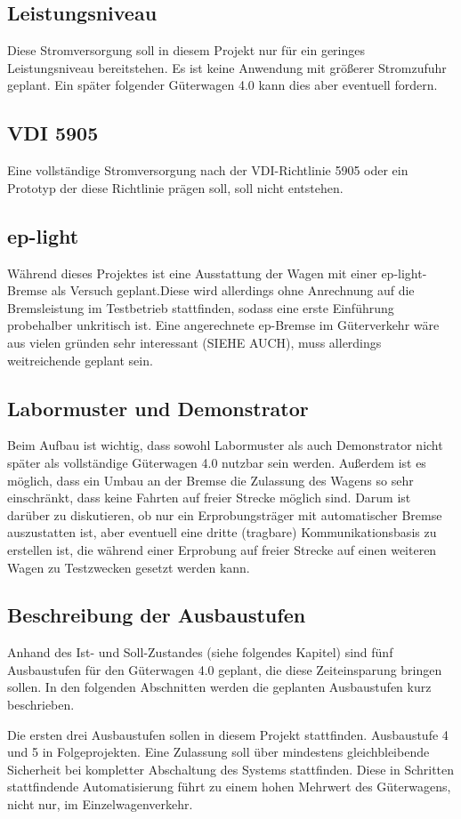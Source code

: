 \subsection{Leistungsniveau}
Diese Stromversorgung soll in diesem Projekt nur für ein geringes Leistungsniveau bereitstehen. Es ist keine Anwendung mit größerer Stromzufuhr geplant. Ein später folgender Güterwagen 4.0  kann dies aber eventuell fordern.
\subsection{VDI 5905}
Eine vollständige Stromversorgung nach der VDI-Richtlinie 5905 oder ein Prototyp der diese Richtlinie prägen soll, soll nicht entstehen. 
\subsection{ep-light}
Während dieses Projektes ist eine Ausstattung der Wagen mit einer ep-light-Bremse als Versuch geplant.Diese wird allerdings ohne Anrechnung auf die Bremsleistung im Testbetrieb stattfinden, sodass eine erste Einführung probehalber unkritisch ist. Eine angerechnete ep-Bremse im Güterverkehr wäre aus vielen gründen sehr interessant (SIEHE AUCH), muss allerdings weitreichende geplant sein.\par
\subsection{Labormuster und Demonstrator}
Beim Aufbau ist wichtig, dass sowohl Labormuster als auch Demonstrator nicht später als vollständige Güterwagen 4.0 nutzbar sein werden. Außerdem ist es möglich, dass ein Umbau an der Bremse die Zulassung des Wagens so sehr einschränkt, dass keine Fahrten auf freier Strecke möglich sind. Darum ist darüber zu diskutieren, ob nur ein Erprobungsträger mit automatischer Bremse auszustatten ist, aber eventuell eine dritte (tragbare) Kommunikationsbasis zu erstellen ist, die während einer Erprobung auf freier Strecke auf einen weiteren Wagen zu Testzwecken gesetzt werden kann.
\subsection{Beschreibung der Ausbaustufen}\label{sec:Ausbaustufen}
Anhand des Ist- und Soll-Zustandes (siehe folgendes Kapitel) sind fünf Ausbaustufen für den Güterwagen 4.0 geplant, die diese Zeiteinsparung bringen sollen. In den folgenden Abschnitten werden die geplanten Ausbaustufen kurz beschrieben.\par
Die ersten drei Ausbaustufen sollen in diesem Projekt stattfinden. Ausbaustufe 4 und 5 in Folgeprojekten. Eine Zulassung soll über mindestens gleichbleibende Sicherheit bei kompletter Abschaltung des Systems stattfinden. Diese in Schritten stattfindende Automatisierung führt zu einem hohen Mehrwert des Güterwagens, nicht nur, im Einzelwagenverkehr.
